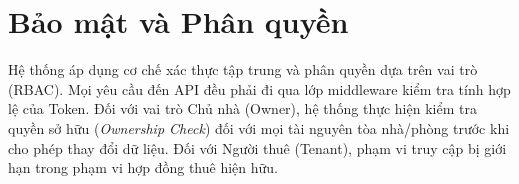 \section{Bảo mật và Phân quyền}

Hệ thống áp dụng cơ chế xác thực tập trung và phân quyền dựa trên vai trò (RBAC). Mọi yêu cầu đến API đều phải đi qua lớp middleware kiểm tra tính hợp lệ của Token. Đối với vai trò Chủ nhà (Owner), hệ thống thực hiện kiểm tra quyền sở hữu (\textit{Ownership Check}) đối với mọi tài nguyên tòa nhà/phòng trước khi cho phép thay đổi dữ liệu. Đối với Người thuê (Tenant), phạm vi truy cập bị giới hạn trong phạm vi hợp đồng thuê hiện hữu.
